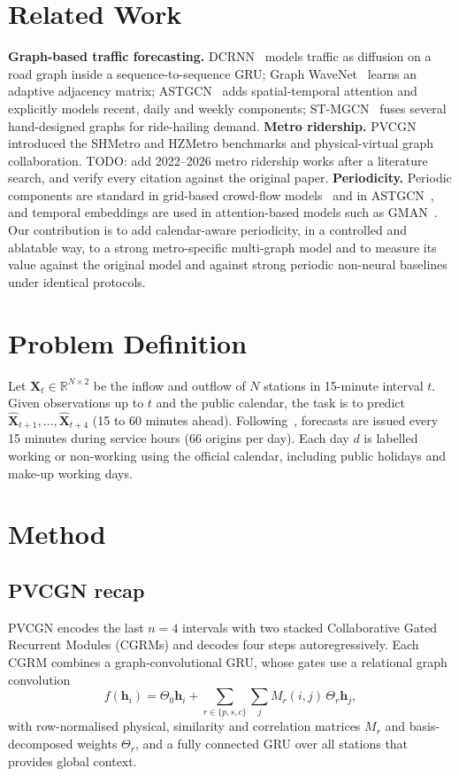 \documentclass[journal]{IEEEtran}
\begin{document}
\section{Related Work}
\textbf{Graph-based traffic forecasting.} DCRNN~\cite{li2018dcrnn} models traffic as diffusion on a road graph inside a sequence-to-sequence GRU; Graph WaveNet~\cite{wu2019graphwavenet} learns an adaptive adjacency matrix; ASTGCN~\cite{guo2019astgcn} adds spatial-temporal attention and explicitly models recent, daily and weekly components; ST-MGCN~\cite{geng2019stmgcn} fuses several hand-designed graphs for ride-hailing demand.
\textbf{Metro ridership.} PVCGN~\cite{liu2022pvcgn} introduced the SHMetro and HZMetro benchmarks and physical-virtual graph collaboration. TODO: add 2022--2026 metro ridership works after a literature search, and verify every citation against the original paper.
\textbf{Periodicity.} Periodic components are standard in grid-based crowd-flow models~\cite{zhang2017stresnet,yao2019stdn} and in ASTGCN~\cite{guo2019astgcn}, and temporal embeddings are used in attention-based models such as GMAN~\cite{zheng2020gman}. Our contribution is to add calendar-aware periodicity, in a controlled and ablatable way, to a strong metro-specific multi-graph model and to measure its value against the original model and against strong periodic non-neural baselines under identical protocols.

\section{Problem Definition}
Let $\mathbf{X}_t\in\mathbb{R}^{N\times 2}$ be the inflow and outflow of $N$ stations in 15-minute interval $t$. Given observations up to $t$ and the public calendar, the task is to predict $\hat{\mathbf{X}}_{t+1},\dots,\hat{\mathbf{X}}_{t+4}$ (15 to 60 minutes ahead). Following~\cite{liu2022pvcgn}, forecasts are issued every 15 minutes during service hours (66 origins per day). Each day $d$ is labelled working or non-working using the official calendar, including public holidays and make-up working days.

\section{Method}
\subsection{PVCGN recap}
PVCGN encodes the last $n=4$ intervals with two stacked Collaborative Gated Recurrent Modules (CGRMs) and decodes four steps autoregressively. Each CGRM combines a graph-convolutional GRU, whose gates use a relational graph convolution
\begin{equation}
f(\mathbf{h}_i)=\Theta_0\mathbf{h}_i+\sum_{r\in\{p,s,c\}}\sum_{j}M_r(i,j)\,\Theta_r\mathbf{h}_j,
\label{eq:rgcn}
\end{equation}
with row-normalised physical, similarity and correlation matrices $M_r$ and basis-decomposed weights $\Theta_r$, and a fully connected GRU over all stations that provides global context.
\end{document}
